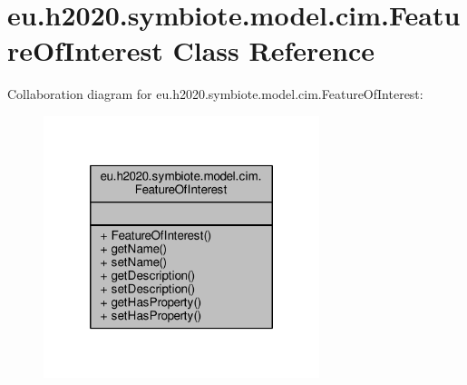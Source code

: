 \hypertarget{classeu_1_1h2020_1_1symbiote_1_1model_1_1cim_1_1FeatureOfInterest}{}\section{eu.\+h2020.\+symbiote.\+model.\+cim.\+Feature\+Of\+Interest Class Reference}
\label{classeu_1_1h2020_1_1symbiote_1_1model_1_1cim_1_1FeatureOfInterest}


Collaboration diagram for eu.\+h2020.\+symbiote.\+model.\+cim.\+Feature\+Of\+Interest\+:\nopagebreak
\begin{figure}[H]
\begin{center}
\leavevmode
\includegraphics[width=228pt]{classeu_1_1h2020_1_1symbiote_1_1model_1_1cim_1_1FeatureOfInterest__coll__graph}
\end{center}
\end{figure}
